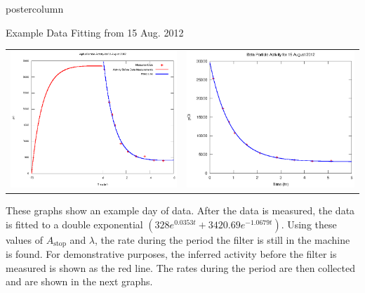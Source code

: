 \documentclass[final,11pt]{beamer}
\begin{document}
\begin{frame}
\begin{columns}
\begin{column}{.39\textwidth}
\begin{beamercolorbox}[center,wd=\textwidth]{postercolumn}
\begin{minipage}[T]{.95\textwidth}
{						\begin{block}{Example Data Fitting from 15 Aug. 2012}
							\begin{center}
							\begin{tabularx}{\linewidth}{X X}
							\includegraphics[width=.95\linewidth]{alpha20120815} & 
							\includegraphics[width=0.95\linewidth]{beta20120815}
							\end{tabularx}
							\end{center}
							\footnotesize These graphs show an example day of data. After the data is measured, the data is fitted to a double exponential $\left(328 e^{0.0353 t} + 3420.69 e^{-1.0679 t}\right)$. Using these values of $A_\text{stop}$ and $\lambda$, the rate during the period the filter is still in the machine is found. For demonstrative purposes, the inferred activity before the filter is measured is shown as the red line. The rates during the period are then collected and are shown in the next graphs.
						\end{block}

}
\end{minipage}
\end{beamercolorbox}
\end{column}
\end{columns}
\end{frame}
\end{document}

